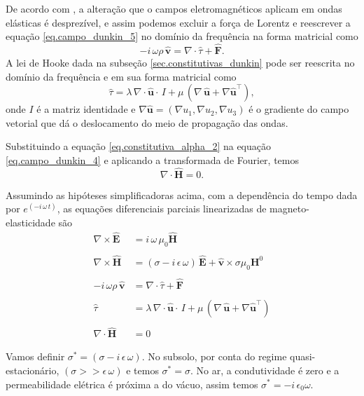 De acordo com \cite{Knopoff_1955}, a altera\c{c}\~ao que o campos eletromagn\'eticos aplicam em ondas el\'asticas \'e desprez\'ivel, e assim podemos excluir a for\c{c}a de Lorentz e reescrever a equa\c{c}\~ao \ref{eq.campo_dunkin_5} no dom\'inio da frequ\^encia na forma matricial como 
\begin{equation}
-i\,\omega\rho\,\mathbf{\widehat{v}}=\nabla\cdot\widehat{\tau} + \mathbf{\widehat{F}}.
\end{equation}
A lei de Hooke dada na subse\c{c}\~ao \ref{sec.constitutivas_dunkin} pode ser reescrita no dom\'inio da frequ\^encia e em sua forma matricial como
\begin{equation}
\widehat{\tau}=\lambda\,\nabla\cdot\mathbf{\widehat{u}}\cdot\,I + \mu\,(\nabla\,\mathbf{\widehat{u}}+\nabla\mathbf{\widehat{u}}^\top),
\end{equation}
onde $I$ \'e a matriz identidade e $\nabla\mathbf{\widehat{u}}=(\nabla u_1,\nabla u_2,\nabla u_3)$ \'e o gradiente do campo vetorial que d\'a o deslocamento do meio de propaga\c{c}\~ao das ondas.

Substituindo a equa\c{c}\~ao \ref{eq.constitutiva_alpha_2} na equa\c{c}\~ao \ref{eq.campo_dunkin_4} e aplicando a transformada de Fourier, temos
\begin{equation}
\nabla\cdot\mathbf{\widehat{H}}=0.
\end{equation}

Assumindo as hip\'oteses simplificadoras acima, com a depend\^encia do tempo dada por $e^{(-i\,\omega\,t)}$, as equa\c{c}\~oes diferenciais parciais linearizadas de magneto-elasticidade s\~ao
\begin{align*}
\nabla\times\mathbf{\widehat{E}}&=i\,\omega\,\mu_0\mathbf{\widehat{H}}\\\\
\nabla\times\mathbf{\widehat{H}}&=(\sigma-i\,\epsilon\,\omega)\,\mathbf{\widehat{E}}+\mathbf{\widehat{v}}\times\sigma\mu_0\mathbf{H}^0\\\\
-i\,\omega\rho\,\mathbf{\widehat{v}}&=\nabla\cdot\widehat{\tau} + \mathbf{\widehat{F}}\\\\
\widehat{\tau}&=\lambda\,\nabla\cdot\mathbf{\widehat{u}}\cdot\,I + \mu\,(\nabla\,\mathbf{\widehat{u}}+\nabla\mathbf{\widehat{u}}^\top)\\\\
\nabla\cdot\mathbf{\widehat{H}}&=0
\end{align*}

Vamos definir $\sigma^*=(\sigma-i\,\epsilon\,\omega)$. No subsolo, por conta do regime quasi-estacion\'ario, $(\sigma>>\epsilon\,\omega)$  e  temos $\sigma^*=\sigma$. No ar, a condutividade \'e zero e a permeabilidade el\'etrica \'e pr\'oxima a do v\'acuo, assim temos $\sigma^*=-i\,\epsilon_0\omega$.
